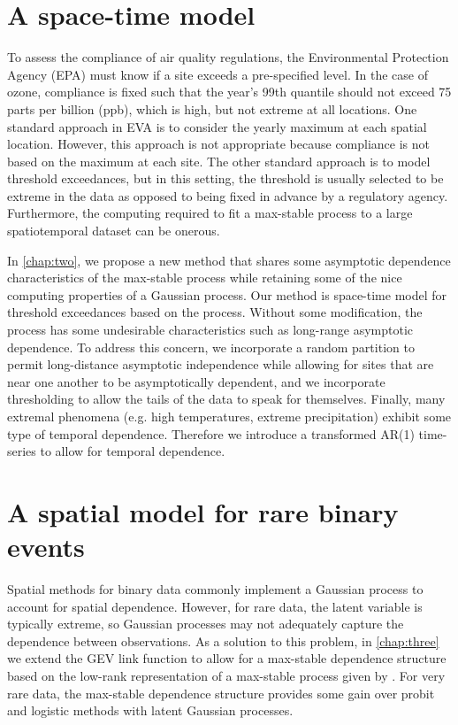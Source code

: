 \section{A space-time \skewt model}

To assess the compliance of air quality regulations, the Environmental Protection Agency (EPA) must know if a site exceeds a pre-specified level.
In the case of ozone, compliance is fixed such that the year's 99th quantile should not exceed 75 parts per billion (ppb), which is high, but not extreme at all locations.
One standard approach in EVA is to consider the yearly maximum at each spatial location.
However, this approach is not appropriate because compliance is not based on the maximum at each site.
The other standard approach is to model threshold exceedances, but in this setting, the threshold is usually selected to be extreme in the data as opposed to being fixed in advance by a regulatory agency.
Furthermore, the computing required to fit a max-stable process to a large spatiotemporal dataset can be onerous.

In \cref{chap:two}, we propose a new method that shares some asymptotic dependence characteristics of the max-stable process while retaining some of the nice computing properties of a Gaussian process.
Our method is space-time model for threshold exceedances based on the \skewt process.
Without some modification, the \skewt process has some undesirable characteristics such as long-range asymptotic dependence.
To address this concern, we incorporate a random partition to permit long-distance asymptotic independence while allowing for sites that are near one another to be asymptotically dependent, and we incorporate thresholding to allow the tails of the data to speak for themselves.
Finally, many extremal phenomena (e.g. high temperatures, extreme precipitation) exhibit some type of temporal dependence.
Therefore we introduce a transformed AR(1) time-series to allow for temporal dependence.

\section{A spatial model for rare binary events}
Spatial methods for binary data commonly implement a Gaussian process to account for spatial dependence.
However, for rare data, the latent variable is typically extreme, so Gaussian processes may not adequately capture the dependence between observations.
As a solution to this problem, in \cref{chap:three} we extend the GEV link \citep{Wang2010} function to allow for a max-stable dependence structure based on the low-rank representation of a max-stable process given by \citet{Reich2012}.
For very rare data, the max-stable dependence structure provides some gain over probit and logistic methods with latent Gaussian processes.

